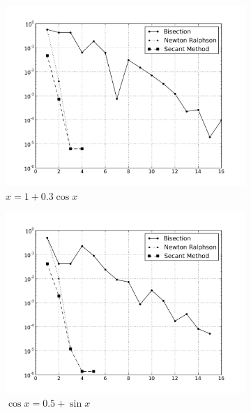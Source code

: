 \documentclass[12,a4paper]{article}
\begin{document}
\begin{figure}[h!]
\begin{subfigure}[t]{0.49\textwidth}
            \includegraphics[width=\textwidth]{plots/root3.png}
            \caption{$x = 1+0.3\cos x$}
            \label{fig:root3}
        \end{subfigure}
        \begin{subfigure}[t]{0.49\textwidth}
            \includegraphics[width=\textwidth]{plots/root4.png}
            \caption{$\cos x=0.5 + \sin x$}
            \label{fig:root4}
        \end{subfigure}
        \begin{subfigure}[t]{0.49\textwidth}

\end{subfigure}
\end{figure}
\end{document}

